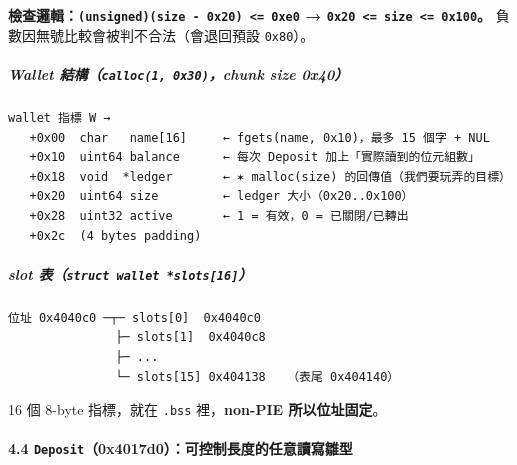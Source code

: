 \documentclass[10pt,a4paper]{article}
\begin{document}
\textbf{檢查邏輯：\texttt{(unsigned)(size\ \allowbreak{}-\allowbreak{}\ \allowbreak{}0x20)\ \allowbreak{}\textless{}\allowbreak{}=\ \allowbreak{}0xe0}
→ \texttt{0x20\ \allowbreak{}\textless{}\allowbreak{}=\ \allowbreak{}size\ \allowbreak{}\textless{}\allowbreak{}=\ \allowbreak{}0x100}。}
負數因無號比較會被判不合法（會退回預設 \texttt{0x80}）。

\subparagraph{\texorpdfstring{Wallet
結構（\texttt{calloc(1,\allowbreak{}\ \allowbreak{}0x30)}，chunk size
0x40）}{Wallet 結構（calloc(1, 0x30)，chunk size 0x40）}}\label{wallet-ux7d50ux69cbcalloc1-0x30chunk-size-0x40}

\begin{Verbatim}[breaklines=true,breakanywhere=true,breakautoindent=false,fontsize=\fontsize{7.0}{9.5}\selectfont]
wallet 指標 W →
   +0x00  char   name[16]     ← fgets(name, 0x10)，最多 15 個字 + NUL
   +0x10  uint64 balance      ← 每次 Deposit 加上「實際讀到的位元組數」
   +0x18  void  *ledger       ← ✶ malloc(size) 的回傳值（我們要玩弄的目標）
   +0x20  uint64 size         ← ledger 大小（0x20..0x100）
   +0x28  uint32 active       ← 1 = 有效，0 = 已關閉/已轉出
   +0x2c  (4 bytes padding)
\end{Verbatim}

\subparagraph{\texorpdfstring{slot
表（\texttt{struct\ \allowbreak{}wallet\ \allowbreak{}*slots{[}16{]}}）}{slot 表（struct wallet *slots{[}16{]}）}}\label{slot-ux8868struct-wallet-slots16}

\begin{Verbatim}[breaklines=true,breakanywhere=true,breakautoindent=false,fontsize=\fontsize{7.0}{9.5}\selectfont]
位址 0x4040c0 ─┬─ slots[0]  0x4040c0
               ├─ slots[1]  0x4040c8
               ├─ ...
               └─ slots[15] 0x404138   （表尾 0x404140）
\end{Verbatim}

16 個 8-byte 指標，就在 \texttt{.\allowbreak{}bss} 裡，\textbf{non-PIE
所以位址固定}。

\paragraph{\texorpdfstring{4.4
\texttt{Deposit}（0x4017d0）：\textbf{可控制長度的任意讀寫雛型}}{4.4 Deposit（0x4017d0）：可控制長度的任意讀寫雛型}}\label{deposit0x4017d0ux53efux63a7ux5236ux9577ux5ea6ux7684ux4efbux610fux8b80ux5bebux96dbux578b}
\end{document}
